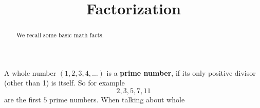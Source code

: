 \documentclass[12pt,noauthor,nooutcomes]{ximera}
\author{}
\title{Factorization}
\begin{document}
\begin{abstract}
    We recall some basic math facts.
\end{abstract}
\maketitle



A whole number $(1, 2, 3, 4, \dots )$ is a \textbf{prime number}, if its only positive divisor (other than 1) is itself. So for example
\[
2,3,5,7,11
\]
are the first $5$ prime numbers. When talking about whole 
\end{document}
